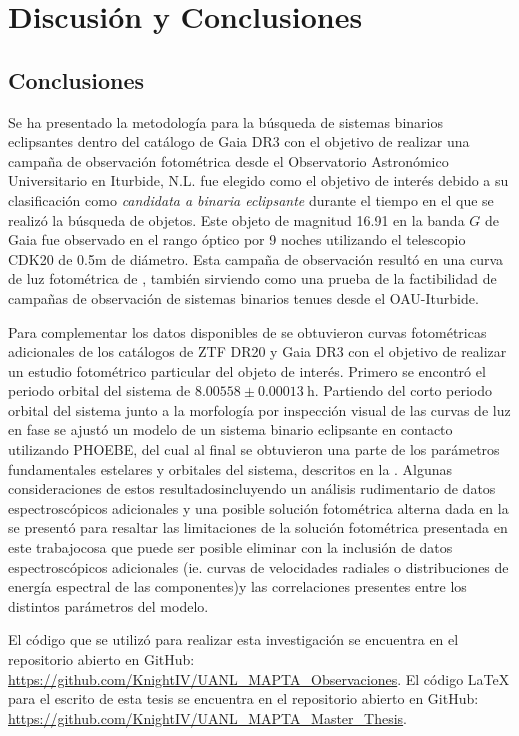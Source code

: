 \part{Discusión y Conclusiones}



\chapter{Conclusiones}

Se ha presentado la metodología para la búsqueda de sistemas binarios 
eclipsantes dentro del
catálogo de Gaia DR3 con el objetivo de realizar una campaña de observación
fotométrica desde el Observatorio Astronómico Universitario en Iturbide, N.L.
\atoObjId fue elegido como el objetivo de interés debido a su clasificación como
\textit{candidata a binaria eclipsante} durante el tiempo en el que se realizó
la búsqueda de objetos. Este objeto de magnitud 16.91 en la banda $G$ de Gaia
fue observado en el rango óptico por 9 noches utilizando el telescopio CDK20 de
0.5m de diámetro. Esta campaña de observación resultó en una curva de luz
fotométrica de \atoObjIdNoSpace, también sirviendo como una prueba de la
factibilidad de campañas de observación de sistemas binarios tenues desde el
OAU-Iturbide.

Para complementar los datos disponibles de \atoObjId se obtuvieron curvas
fotométricas adicionales de los catálogos de ZTF DR20 y Gaia DR3 con el objetivo
de realizar un estudio fotométrico particular del objeto de interés. Primero se
encontró el periodo orbital del sistema de $8.00558 \pm 0.00013 \ \mathrm{h}$.
Partiendo del corto periodo orbital del sistema junto a la morfología por
inspección visual de las curvas de luz en fase se ajustó un modelo de un sistema
binario eclipsante en contacto utilizando PHOEBE, del cual al final se
obtuvieron una parte de los parámetros fundamentales estelares y orbitales del
sistema, descritos en la
. Algunas
consideraciones de estos resultados\textemdash incluyendo un análisis
rudimentario de datos espectroscópicos adicionales y una posible solución
fotométrica alterna dada en la
\textemdash
se presentó para resaltar las limitaciones de la solución fotométrica presentada
en este trabajo\textemdash cosa que puede ser posible eliminar con la inclusión
de datos espectroscópicos adicionales (ie. curvas de velocidades radiales o
distribuciones de energía espectral de las componentes)\textemdash y las
correlaciones presentes entre los distintos parámetros del modelo.

El código que se utilizó para realizar esta investigación se encuentra en el
repositorio abierto en GitHub:
\url{https://github.com/KnightIV/UANL_MAPTA_Observaciones}. El código LaTeX para
el escrito de esta tesis se encuentra en el repositorio abierto en GitHub:
\url{https://github.com/KnightIV/UANL_MAPTA_Master_Thesis}.